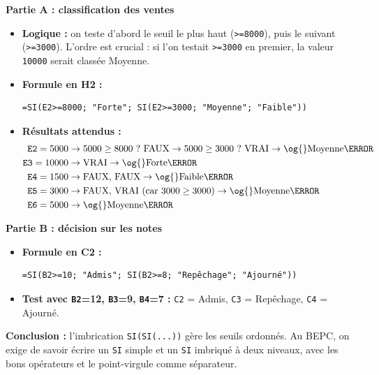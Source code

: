 \documentclass[11pt]{article}
\begin{document}
\begin{exoresolu}
\textbf{Partie A : classification des ventes}
\begin{itemize}
    \item \textbf{Logique :} on teste d'abord le seuil le plus haut (\texttt{>=8000}), puis le suivant (\texttt{>=3000}). L'ordre est crucial : si l'on testait \texttt{>=3000} en premier, la valeur \texttt{10000} serait classée \og{}Moyenne\fg{}.
    \item \textbf{Formule en H2 :}
    \begin{lstlisting}
=SI(E2>=8000; "Forte"; SI(E2>=3000; "Moyenne"; "Faible"))
    \end{lstlisting}
    \item \textbf{Résultats attendus :}
    \begin{align*}
    \texttt{E2}=5000 &\rightarrow 5000 \ge 8000\ ?\ \text{FAUX} \rightarrow 5000 \ge 3000\ ?\ \text{VRAI} \rightarrow \text{\og{}Moyenne\fg{}} \\
    \texttt{E3}=10000 &\rightarrow \text{VRAI} \rightarrow \text{\og{}Forte\fg{}} \\
    \texttt{E4}=1500 &\rightarrow \text{FAUX, FAUX} \rightarrow \text{\og{}Faible\fg{}} \\
    \texttt{E5}=3000 &\rightarrow \text{FAUX, VRAI (car } 3000 \ge 3000\text{)} \rightarrow \text{\og{}Moyenne\fg{}} \\
    \texttt{E6}=5000 &\rightarrow \text{\og{}Moyenne\fg{}}
    \end{align*}
\end{itemize}
\textbf{Partie B : décision sur les notes}
\begin{itemize}
    \item \textbf{Formule en C2 :}
    \begin{lstlisting}
=SI(B2>=10; "Admis"; SI(B2>=8; "Repêchage"; "Ajourné"))
    \end{lstlisting}
    \item \textbf{Test avec \texttt{B2}=12, \texttt{B3}=9, \texttt{B4}=7 :} \texttt{C2} = \og{}Admis\fg{}, \texttt{C3} = \og{}Repêchage\fg{}, \texttt{C4} = \og{}Ajourné\fg{}.
\end{itemize}
\textbf{Conclusion :} l'imbrication \texttt{SI(SI(...))} gère les seuils ordonnés. Au BEPC, on exige de savoir écrire un \texttt{SI} simple et un \texttt{SI} imbriqué à deux niveaux, avec les bons opérateurs et le point-virgule comme séparateur.
\end{exoresolu}
\end{document}
